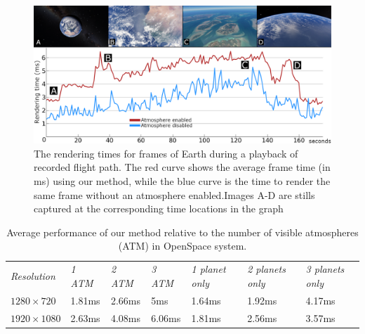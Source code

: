 \documentclass[journal]{vgtc}                %
\begin{document}
\begin{figure}[b]
 \centering
 \includegraphics[width=\columnwidth]{figures/performance_image.png}
 \vspace*{-7mm}
 \caption{The rendering times for frames of Earth during a playback of recorded flight path. The red curve shows the average frame time (in ms) using our method, while the blue curve is the time to render the same frame without an atmosphere enabled.Images A-D are stills captured at the corresponding time locations in the graph}
 \label{fig:Performance}
 \vspace*{-2mm}
\end{figure}
\begingroup
\setlength{\tabcolsep}{0.2em}
\begin{table}[t]
  \centering
  \begin{tabular}{|p{1.4cm}|p{0.8cm} p{0.8cm} p{0.8cm} p{1.4cm} p{1.4cm} p{1.4cm}|}
    \hline
    \small{\textit{Resolution}} & \small{\textit{1 ATM}} & \small{\textit{2 ATM}} & \small{\textit{3 ATM}} & \small{\textit{1 planet only}}  & \small{\textit{2 planets only}}  & \small{\textit{3 planets only}}\\
    {\small $1280\times720$} & {\small 1.81ms} & {\small 2.66ms} & {\small 5ms} & {\small 1.64ms} & {\small 1.92ms} & {\small 4.17ms}\\
    {\small $1920\times1080$} & {\small 2.63ms} & {\small 4.08ms} & {\small 6.06ms} & {\small 1.81ms} & {\small 2.56ms} & {\small 3.57ms}\\
    \hline
  \end{tabular}
  \vspace*{0.1cm}
  \caption{Average performance of our method relative to the number of visible atmospheres (ATM) in OpenSpace system.}
  \label{tab:performance}
\vspace*{-7mm}
\end{table}
\endgroup
\end{document}
